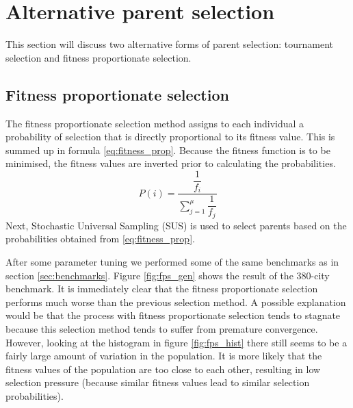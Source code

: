 

\section{Alternative parent selection}
 This section will discuss two alternative forms of parent selection: tournament selection and fitness proportionate selection. 
 
 \subsection{Fitness proportionate selection}
 The fitness proportionate selection method assigns to each individual a probability of selection that is directly proportional to its fitness value. This is summed up in formula \ref{eq:fitness_prop}. Because the fitness function is to be minimised, the fitness values are inverted prior to calculating the probabilities. 
 \begin{equation} \label{eq:fitness_prop}
 P(i) = \dfrac{\dfrac{1}{f_i}}{\sum\limits_{j=1}^\mu {\dfrac{1}{f_j}}}
 \end{equation}
 Next, Stochastic Universal Sampling (SUS) is used to select parents based on the probabilities obtained from \ref{eq:fitness_prop}.
 
 After some parameter tuning we performed some of the same benchmarks as in section \ref{sec:benchmarks}. Figure \ref{fig:fps_gen} shows the result of the 380-city benchmark. It is immediately clear that the fitness proportionate selection performs much worse than the previous selection method. A possible explanation would be that the process with fitness proportionate selection tends to stagnate because this selection method tends to suffer from premature convergence. However, looking at the histogram in figure \ref{fig:fps_hist} there still seems to be a fairly large amount of variation in the population. It is more likely that the fitness values of the population are too close to each other, resulting in low selection pressure (because similar fitness values lead to similar selection probabilities).
 
